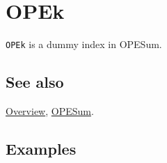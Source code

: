 \documentclass[../FeynCalcManual.tex]{subfiles}
\begin{document}
\hypertarget{opek}{%
\section{OPEk}\label{opek}}

\texttt{OPEk} is a dummy index in OPESum.

\subsection{See also}

\hyperlink{toc}{Overview}, \hyperlink{opesum}{OPESum}.

\subsection{Examples}
\end{document}
